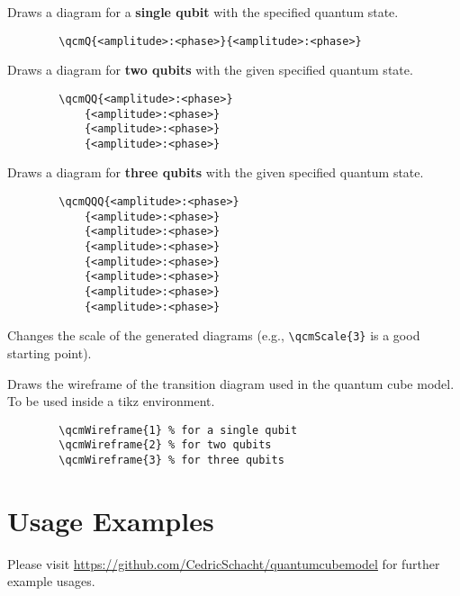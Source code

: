 \documentclass{article}
\begin{document}
\begin{description}
    \item Draws a diagram for a \textbf{single qubit} with the specified quantum state.
    \begin{verbatim}
        \qcmQ{<amplitude>:<phase>}{<amplitude>:<phase>}
    \end{verbatim}

    \item Draws a diagram for \textbf{two qubits} with the given specified quantum state.
    \begin{verbatim}
        \qcmQQ{<amplitude>:<phase>}
            {<amplitude>:<phase>}
            {<amplitude>:<phase>}
            {<amplitude>:<phase>}
    \end{verbatim}

    \item  Draws a diagram for \textbf{three qubits} with the given specified quantum state.
    \begin{verbatim}
        \qcmQQQ{<amplitude>:<phase>}
            {<amplitude>:<phase>}
            {<amplitude>:<phase>}
            {<amplitude>:<phase>}
            {<amplitude>:<phase>}
            {<amplitude>:<phase>}
            {<amplitude>:<phase>}
            {<amplitude>:<phase>}
    \end{verbatim}

  
    \item Changes the scale of the generated diagrams (e.g., \verb|\qcmScale{3}| is a good starting point).
  
    \item Draws the wireframe of the transition diagram used in the quantum cube model.
        To be used inside a tikz environment.
    \begin{verbatim}
        \qcmWireframe{1} % for a single qubit
        \qcmWireframe{2} % for two qubits
        \qcmWireframe{3} % for three qubits
    \end{verbatim}
\end{description}

\section*{Usage Examples}
Please visit \href{https://github.com/CedricSchacht/quantumcubemodel}{https://github.com/CedricSchacht/quantumcubemodel}
for further example usages.
\end{document}
